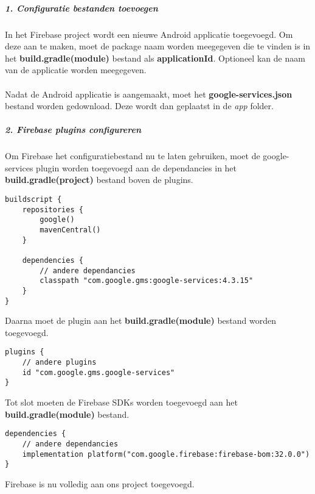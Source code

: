 \subparagraph{1. Configuratie bestanden toevoegen}
In het Firebase project wordt een nieuwe Android applicatie toegevoegd. Om deze aan te maken, moet de package naam 
worden meegegeven die te vinden is in het \textbf{build.gradle(module)} bestand als \textbf{applicationId}.
Optioneel kan de naam van de applicatie worden meegegeven.
\\\\
Nadat de Android applicatie is aangemaakt, moet het \textbf{google-services.json} bestand worden gedownload. 
Deze wordt dan geplaatst in de \textit{app} folder.

\subparagraph{2. Firebase plugins configureren}
Om Firebase het configuratiebestand nu te laten gebruiken, moet de google-services plugin worden toegevoegd aan 
de dependancies in het \textbf{build.gradle(project)} bestand boven de plugins. 
\begin{verbatim}
buildscript {
    repositories {
        google()
        mavenCentral()
    }

    dependencies {
        // andere dependancies
        classpath "com.google.gms:google-services:4.3.15"
    }
}
\end{verbatim}
Daarna moet de plugin aan het \textbf{build.gradle(module)} bestand worden toegevoegd.
\begin{verbatim}
plugins {
    // andere plugins 
    id "com.google.gms.google-services"
}
\end{verbatim}
Tot slot moeten de Firebase SDKs worden toegevoegd aan het \textbf{build.gradle(module)} bestand.
\begin{verbatim}
dependencies {
    // andere dependancies
    implementation platform("com.google.firebase:firebase-bom:32.0.0")
}
\end{verbatim}
Firebase is nu volledig aan ons project toegevoegd.